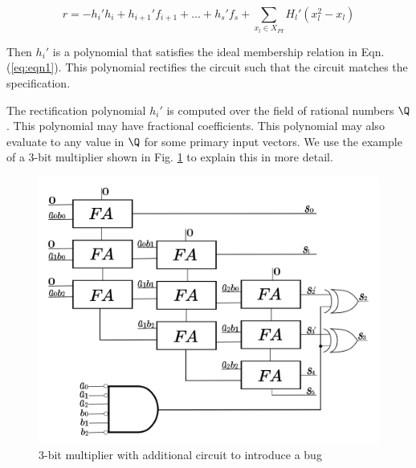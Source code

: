 \begin{equation}
    r = -h_i'h_i+h_{i+1}'f_{i+1}+\dots+h_s'f_s+ \sum_{x_l \in X_{PI}} H_l' (x_l^2-x_l)
    \label{eq:eqn6}
\end{equation}

Then $h_i'$ is a polynomial that satisfies the ideal membership relation in Eqn. (\ref{eq:eqn1}). This polynomial rectifies the circuit such that the circuit matches the specification. 

The rectification polynomial $h_i'$ is computed over the field of rational numbers $\Q$. This polynomial may have fractional coefficients. This polynomial may also evaluate to any value in $\Q$ for some primary input vectors. We use the example of a 3-bit multiplier shown in Fig. \ref{fig:3appmult} to explain this in more detail. 

\begin{figure}[H]
    \centering
    \includegraphics[scale = 0.09]{3appmult.png}
    \caption{3-bit multiplier with additional circuit to introduce a bug}
    \label{fig:3appmult}
\end{figure}

